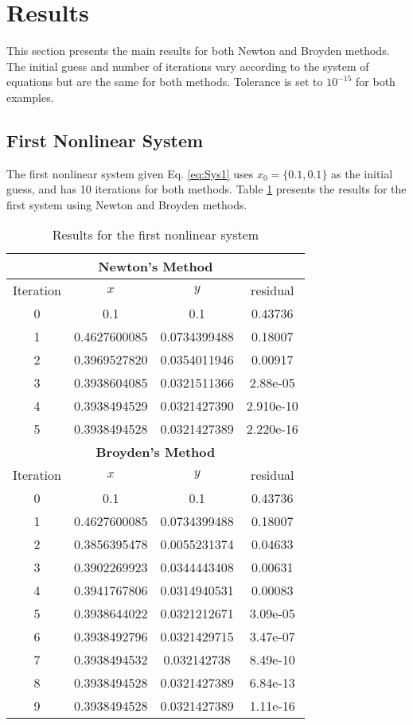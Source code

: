 \section{Results} \label{sec:results}
This section presents the main results for both Newton and Broyden methods. The initial guess and number of iterations vary according to the system of equations but are the same for both methods. Tolerance is set to $10^{-15}$ for both examples.

\subsection{First Nonlinear System}
The first nonlinear system given Eq. \eqref{eq:Sys1} uses  $x_0 = \{0.1, 0.1\}$ as the initial guess, and has 10 iterations for both methods. Table \ref{tab:Sys1} presents the results for the first system using Newton and Broyden methods.
\begin{table}[H]
    \centering
    \caption{Results for the first nonlinear system}
    \begin{tabular}{cccc}
        \hline
        \multicolumn{4}{c}{\textbf{Newton's Method}} \\ \hline
        Iteration & $x$ & $y$ & residual\\
        \hline
        0 & 0.1 & 0.1 & 0.43736 \\
        1 & 0.4627600085 & 0.0734399488 & 0.18007 \\
        2 & 0.3969527820 & 0.0354011946 & 0.00917 \\
        3 & 0.3938604085 & 0.0321511366 & 2.88e-05 \\
        4 & 0.3938494529 & 0.0321427390 & 2.910e-10 \\
        5 & 0.3938494528 & 0.0321427389 & 2.220e-16 \\ \hline
        \multicolumn{4}{c}{\textbf{Broyden's Method}} \\ \hline
        Iteration & $x$ & $y$ & residual\\
        0 & 0.1 & 0.1 & 0.43736 \\
        1 & 0.4627600085 & 0.0734399488 & 0.18007 \\
        2 & 0.3856395478 & 0.0055231374 & 0.04633 \\
        3 & 0.3902269923 & 0.0344443408 & 0.00631 \\
        4 & 0.3941767806 & 0.0314940531 & 0.00083 \\ 
        5 & 0.3938644022 & 0.0321212671 & 3.09e-05 \\
        6 & 0.3938492796 & 0.0321429715 & 3.47e-07 \\
        7 & 0.3938494532 &  0.032142738 & 8.49e-10 \\
        8 & 0.3938494528 & 0.0321427389 & 6.84e-13 \\
        9 & 0.3938494528 & 0.0321427389 & 1.11e-16 \\ \hline
    \end{tabular}
    \label{tab:Sys1}
\end{table}

